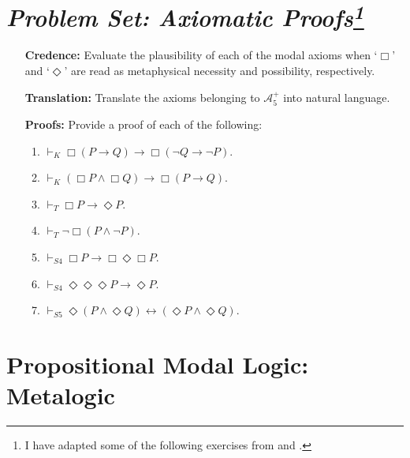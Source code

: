 \documentclass[a4paper, 11pt]{article} %
\begin{document}
\section*{\it Problem Set: Axiomatic Proofs\footnote{I have adapted some of the following exercises from \citet{Studd2016} and \citet{Sider2010}.}}

\begin{enumerate}[leftmargin=1.2in,labelsep=.15in] 
\item[\bf Credence:] Evaluate the plausibility of each of the modal axioms when `$\Box$' and `$\Diamond$' are read as metaphysical necessity and possibility, respectively.
\item[\bf Translation:] Translate the axioms belonging to $\mathcal{A}_5^+$ into natural language. 
\item[\bf Proofs:] Provide a proof of each of the following: 
	\begin{enumerate}[label=(\arabic*),resume]\small
	\item $\vdash_{K} \Box(P\rightarrow Q)\rightarrow\Box(\neg Q\rightarrow \neg P)$.
	\item $\vdash_{K} (\Box P\wedge \Box Q)\rightarrow\Box(P\rightarrow Q)$.
	\item $\vdash_{T} \Box P\rightarrow\Diamond P$.
	\item $\vdash_{T} \neg\Box(P\wedge \neg P)$.
	\item $\vdash_{S4} \Box P\rightarrow\Box\Diamond\Box P$.
	\item $\vdash_{S4} \Diamond\Diamond\Diamond P\rightarrow\Diamond P$.
	\item $\vdash_{S5} \Diamond(P\wedge\Diamond Q)\leftrightarrow(\Diamond P\wedge\Diamond Q)$.
	\end{enumerate}
\end{enumerate}







\section*{\sc Propositional Modal Logic: Metalogic}
\end{document}
